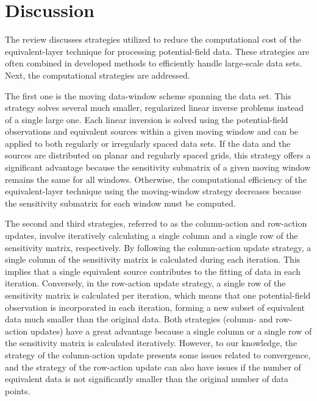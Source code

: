 \section{Discussion}

The review discusses strategies utilized to reduce the computational cost of the equivalent-layer technique for processing potential-field data. These strategies are often combined in developed methods to efficiently handle large-scale data sets. 
Next, the computational strategies are addressed.

The first one is the moving data-window scheme spanning the data set.
This strategy solves several much smaller, regularized linear inverse problems 
instead of a single large one.
Each linear inversion is solved using the potential-field observations and equivalent sources within a given moving window and can be applied to both regularly or irregularly spaced data sets.
If the data and the sources are distributed on planar and regularly spaced grids, this strategy offers a significant advantage because the sensitivity submatrix of a given moving window remains the same for all windows.
Otherwise, the computational efficiency of the equivalent-layer technique using the moving-window strategy decreases because the sensitivity submatrix for each window must be computed.

The second and third strategies, referred to as the column-action and row-action updates, involve iteratively calculating a single column and a single row of the sensitivity matrix, respectively.
By following the column-action update strategy, a single column of the sensitivity matrix is calculated during each iteration. 
This implies that a single equivalent source contributes to the fitting of data in each iteration.
Conversely, in the row-action update strategy, a single row of the sensitivity matrix is calculated per iteration, which means that  one potential-field observation is incorporated in each iteration, 
forming a new subset of equivalent data much smaller than the original data.
Both strategies (column- and row-action updates) have a great advantage  because a single column or a single row of the sensitivity matrix is calculated iteratively.
However, to our knowledge, the strategy of the column-action update presents some issues related to convergence, and the strategy of the row-action update can also have issues if the number of equivalent data  is not significantly smaller than the original number of data points.


